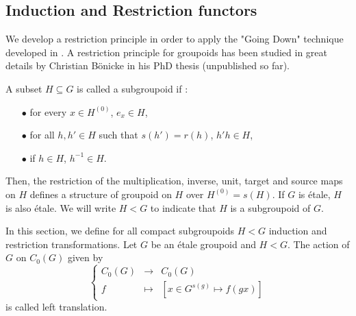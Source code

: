 \subsection{Induction and Restriction functors}

We develop a restriction principle in order to apply the "Going Down" technique developed in \cite{ChabertEOY}. A restriction principle for groupoids has been studied in great details by Christian Bönicke in his PhD thesis (unpublished so far).

\begin{definition} A subset $H\subseteq G$ is called a subgroupoid if :
\begin{itemize}
\item[$\bullet$] for every $x\in H^{(0)}$, $e_x\in H$,
\item[$\bullet$] for all $h,h'\in H $ such that $s(h') = r(h)$, $h'h \in H$,
\item[$\bullet$] if $h\in H$, $h^{-1}\in H$.
\end{itemize}
Then, the restriction of the multiplication, inverse, unit, target and source maps on $H$ defines a structure of groupoid on $H$ over $H^{(0)} = s(H)$. If $G$ is étale, $H$ is also étale. We will write $H< G$ to indicate that $H$ is a subgroupoid of $G$.
\end{definition}

In this section, we define for all compact subgroupoids $H < G$ induction and restriction transformations. Let $G$ be an étale groupoid and $H<G$. The action of $G$ on $C_0(G)$ given by 
\[\left\{ \begin{array}{rcl}
C_0(G) & \rightarrow & C_0(G) \\
f & \mapsto  & [x\in G^{s(g)}\mapsto f(gx) ]
\end{array}\right.\] 
is called left translation.\\


